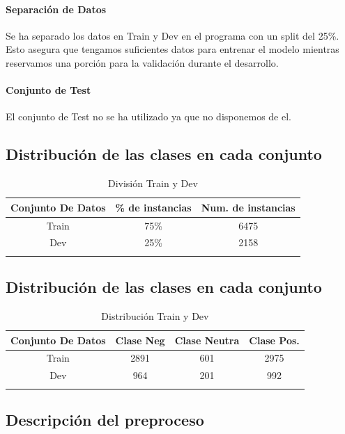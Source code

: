 \documentclass{report}
\begin{document}
                \paragraph*{Separación de Datos}{
                    Se ha separado los datos en Train y Dev en el programa con un split del 25\%. Esto asegura que tengamos suficientes datos para entrenar el modelo mientras reservamos una porción para la validación durante el desarrollo.
                }
                \paragraph*{Conjunto de Test}{
                    El conjunto de Test no se ha utilizado ya que no disponemos de el.
                }
            \subsection{Distribución de las clases en cada conjunto}
                \begin{longtable}{|c|c|c|}
                    \hline
                    \textbf{Conjunto De Datos} & \textbf{\% de instancias}& \textbf{Num. de instancias}  \\ \hline
                    Train & {75\%} & {6475}\\ 
                    \hline
                    Dev & {25\%} & {2158}\\ 
                    \hline
                    \caption{División Train y Dev}
                \end{longtable}
            \subsection{Distribución de las clases en cada conjunto}
                \begin{longtable}{|c|c|c|c|}
                \hline
                \textbf{Conjunto De Datos} & \textbf{Clase Neg} & \textbf{Clase Neutra}  & \textbf{Clase Pos.} \\ 
                \hline
                Train & {2891} & {601} & {2975}\\ 
                \hline
                Dev & {964} & {201} & {992}\\ 
                \hline
                \caption{Distribución Train y Dev}
                \end{longtable}
            \clearpage\subsection{Descripción del preproceso}
\end{document}
